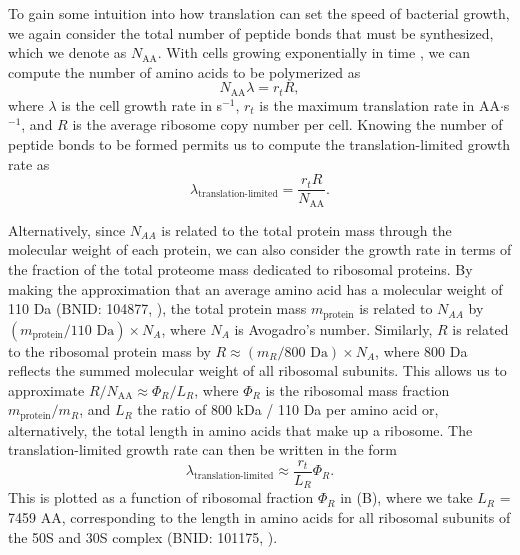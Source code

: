 To gain some intuition into how translation can set the speed of
bacterial growth, we again consider the total number of peptide bonds that must
be synthesized, which we denote as $N_\text{AA}$. With cells growing exponentially in time
\citep{godin2010}, we can compute the number of amino acids to be polymerized as
\begin{equation}
    N_\text{AA} \lambda = r_t R,
\end{equation} where
$\lambda$ is the cell growth rate in s$^{-1}$, $r_t$ is the maximum translation
rate in AA$\cdot$s$^{-1}$, and $R$ is the average ribosome copy number per
cell. Knowing the number of peptide bonds to be formed permits us to compute the
translation-limited growth rate as
\begin{equation}
\lambda_\text{translation-limited} = \frac{r_t R}{N_\text{AA}}.
\end{equation}

Alternatively, since $N_{AA}$ is related to the total protein mass through the
molecular weight of each protein, we can also consider the growth rate in terms
of the fraction of the total proteome mass dedicated to ribosomal proteins. By
making the approximation that an average amino acid has a molecular weight of
110 Da (BNID: 104877, \cite{milo2010}), the total protein mass $m_{\textrm{protein}}$ is related to
$N_{AA}$ by $(m_{\textrm{protein}}/\text{110 Da}) \times N_A$, where $N_A$ is Avogadro's number.
Similarly, $R$ is related to the ribosomal protein mass by $R \approx
(m_R/\text{800 Da}) \times N_A$, where 800 Da reflects the summed molecular weight
of all ribosomal subunits.  This allows us to approximate  $R / N_\text{AA}
\approx \Phi_R / L_R$,  where $\Phi_R$ is the ribosomal mass fraction $m_{\textrm{protein}}/m_R$,
and $L_R$ the ratio of 800 kDa / 110 Da per amino acid or, alternatively, the
total length in amino acids that make up a ribosome. The translation-limited
growth rate can then be written in the form
\begin{equation}
\lambda_{\textrm{translation-limited}} \approx \frac{r_t}{L_R}  \Phi_R.
\label{eq:translation_limit_growth_rate}
\end{equation}
This is plotted as a function of ribosomal fraction $\Phi_R$ in
(B), where we take $L_R$ = 7459 AA, corresponding to the
length in amino acids for all ribosomal subunits of the 50S and 30S complex
(BNID: 101175, \citep{milo2010}).

